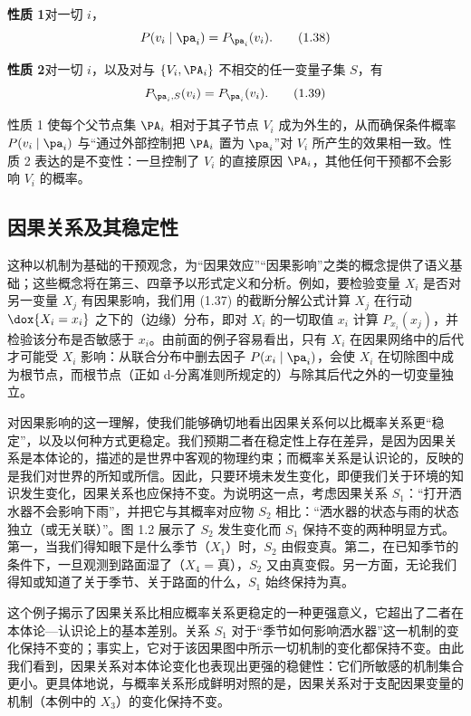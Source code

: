 \textbf{性质 1}\quad 对一切 $i$，
\begin{equation}
P(v_i\mid\pa_i) = P_{\pa_i}(v_i). \tag{1.38}
\end{equation}

\textbf{性质 2}\quad 对一切 $i$，以及对与 $\{V_i,\PA_i\}$ 不相交的任一变量子集 $S$，有
\begin{equation}
P_{\pa_i,S}(v_i) = P_{\pa_i}(v_i). \tag{1.39}
\end{equation}

性质 1 使每个父节点集 $\PA_i$ 相对于其子节点 $V_i$ 成为外生的，从而确保条件概率 $P(v_i\mid\pa_i)$ 与“通过外部控制把 $\PA_i$ 置为 $\pa_i$”对 $V_i$ 所产生的效果相一致。性质 2 表达的是不变性：一旦控制了 $V_i$ 的直接原因 $\PA_i$，其他任何干预都不会影响 $V_i$ 的概率。

\subsection{因果关系及其稳定性}

这种以机制为基础的干预观念，为“因果效应”“因果影响”之类的概念提供了语义基础；这些概念将在第三、四章予以形式定义和分析。例如，要检验变量 $X_i$ 是否对另一变量 $X_j$ 有因果影响，我们用 \textup{(1.37)} 的截断分解公式计算 $X_j$ 在行动 $\dox{X_i=x_i}$ 之下的（边缘）分布，即对 $X_i$ 的一切取值 $x_i$ 计算 $P_{x_i}(x_j)$，并检验该分布是否敏感于 $x_i$。由前面的例子容易看出，只有 $X_i$ 在因果网络中的后代才可能受 $X_i$ 影响：从联合分布中删去因子 $P(x_i\mid\pa_i)$，会使 $X_i$ 在切除图中成为根节点，而根节点（正如 d-分离准则所规定的）与除其后代之外的一切变量独立。

对因果影响的这一理解，使我们能够确切地看出因果关系何以比概率关系更“稳定”，以及以何种方式更稳定。我们预期二者在稳定性上存在差异，是因为因果关系是本体论的，描述的是世界中客观的物理约束；而概率关系是认识论的，反映的是我们对世界的所知或所信。因此，只要环境未发生变化，即便我们关于环境的知识发生变化，因果关系也应保持不变。为说明这一点，考虑因果关系 $S_1$：“打开洒水器不会影响下雨”，并把它与其概率对应物 $S_2$ 相比：“洒水器的状态与雨的状态独立（或无关联）”。图 1.2 展示了 $S_2$ 发生变化而 $S_1$ 保持不变的两种明显方式。第一，当我们得知眼下是什么季节（$X_1$）时，$S_2$ 由假变真。第二，在已知季节的条件下，一旦观测到路面湿了（$X_4=\text{真}$），$S_2$ 又由真变假。另一方面，无论我们得知或知道了关于季节、关于路面的什么，$S_1$ 始终保持为真。

这个例子揭示了因果关系比相应概率关系更稳定的一种更强意义，它超出了二者在本体论—认识论上的基本差别。关系 $S_1$ 对于“季节如何影响洒水器”这一机制的变化保持不变的；事实上，它对于该因果图中所示一切机制的变化都保持不变。由此我们看到，因果关系对本体论变化也表现出更强的稳健性：它们所敏感的机制集合更小。更具体地说，与概率关系形成鲜明对照的是，因果关系对于支配因果变量的机制（本例中的 $X_3$）的变化保持不变。

